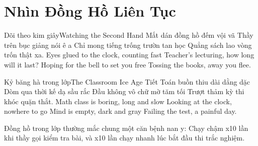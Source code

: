 \chapter{Nhìn Đồng Hồ Liên Tục}

\begin{tutuyetbox}{Dõi theo kim giây}{Watching the Second Hand}
Mắt dán đồng hồ đếm vội vã
Thầy trên bục giảng nói ê a
Chỉ mong tiếng trống trườn tan học
Quẳng sách lao vòng trốn thật xa.
\tcblower
Eyes glued to the clock, counting fast 
Teacher's lecturing, how long will it last? 
Hoping for the bell to set you free 
Tossing the books, away you flee.
\end{tutuyetbox}

\begin{tutuyetbox}{Kỷ băng hà trong lớp}{The Classroom Ice Age}
Tiết Toán buồn thiu dài dằng dặc
Dòm qua thời kế dạ sầu rắc
Đầu không vô chữ mờ tăm tối
Trượt thảm kỳ thi khóc quặn thắt.
\tcblower
Math class is boring, long and slow 
Looking at the clock, nowhere to go 
Mind is empty, dark and gray 
Failing the test, a painful day.
\end{tutuyetbox}

\begin{ghichu}
Đồng hồ trong lớp thường mắc chung một căn bệnh nan y: Chạy chậm x10 lần khi thầy gọi kiểm tra bài, và x10 lần chạy nhanh lúc bắt đầu thi trắc nghiệm.
\end{ghichu}